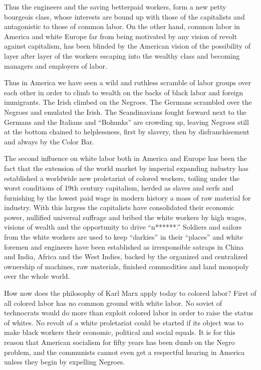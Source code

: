 \documentclass[letterpaper,10pt,english]{jupyterBook}
\begin{document}
\sphinxAtStartPar
Thus the engineers and the saving better\sphinxhyphen{}paid workers, form a new petty bourgeois class, whose interests are bound up with those of the capitalists and antagonistic to those of common labor. On the other hand, common labor in America and white Europe far from being motivated by any vision of revolt against capitalism, has been blinded by the American vision of the possibility of layer after layer of the workers escaping into the wealthy class and becoming managers and employers of labor.

\sphinxAtStartPar
Thus in America we have seen a wild and ruthless scramble of labor groups over each other in order to climb to wealth on the backs of black labor and foreign immigrants. The Irish climbed on the Negroes. The Germans scrambled over the Negroes and emulated the Irish. The Scandinavians fought forward next to the Germans and the Italians and “Bohunks” are crowding up, leaving Negroes still at the bottom chained to helplessness, first by slavery, then by disfranchisement and always by the Color Bar.

\sphinxAtStartPar
The second influence on white labor both in America and Europe has been the fact that the extension of the world market by imperial expanding industry has established a world\sphinxhyphen{}wide new proletariat of colored workers, toiling under the worst conditions of 19th century capitalism, herded as slaves and serfs and furnishing by the lowest paid wage in modern history a mass of raw material for industry. With this largess the capitalists have consolidated their economic power, nullified universal suffrage and bribed the white workers by high wages, visions of wealth and the opportunity to drive “n******.” Soldiers and sailors from the white workers are used to keep “darkies” in their “places” and white foremen and engineers have been established as irresponsible satraps in China and India, Africa and the West Indies, backed by the organized and centralized ownership of machines, raw materials, finished commodities and land monopoly over the whole world.

\sphinxAtStartPar
How now does the philosophy of Karl Marx apply today to colored labor? First of all colored labor has no common ground with white labor. No soviet of technocrats would do more than exploit colored labor in order to raise the status of whites. No revolt of a white proletariat could be started if its object was to make black workers their economic, political and social equals. It is for this reason that American socialism for fifty years has been dumb on the Negro problem, and the communists cannot even get a respectful hearing in America unless they begin by expelling Negroes.
\end{document}
